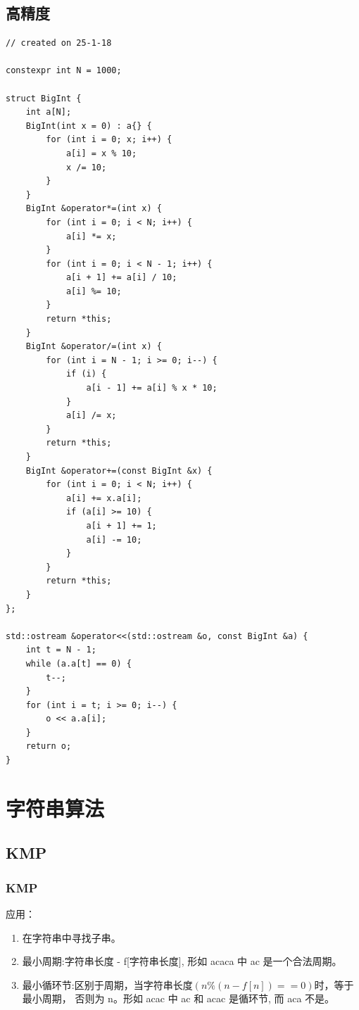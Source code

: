 \documentclass[a4paper,12pt]{article}
\begin{document}
\subsection{高精度}
\begin{lstlisting}
// created on 25-1-18

constexpr int N = 1000;

struct BigInt {
    int a[N];
    BigInt(int x = 0) : a{} {
        for (int i = 0; x; i++) {
            a[i] = x % 10;
            x /= 10;
        }
    }
    BigInt &operator*=(int x) {
        for (int i = 0; i < N; i++) {
            a[i] *= x;
        }
        for (int i = 0; i < N - 1; i++) {
            a[i + 1] += a[i] / 10;
            a[i] %= 10;
        }
        return *this;
    }
    BigInt &operator/=(int x) {
        for (int i = N - 1; i >= 0; i--) {
            if (i) {
                a[i - 1] += a[i] % x * 10;
            }
            a[i] /= x;
        }
        return *this;
    }
    BigInt &operator+=(const BigInt &x) {
        for (int i = 0; i < N; i++) {
            a[i] += x.a[i];
            if (a[i] >= 10) {
                a[i + 1] += 1;
                a[i] -= 10;
            }
        }
        return *this;
    }
};

std::ostream &operator<<(std::ostream &o, const BigInt &a) {
    int t = N - 1;
    while (a.a[t] == 0) {
        t--;
    }
    for (int i = t; i >= 0; i--) {
        o << a.a[i];
    }
    return o;
}
\end{lstlisting}
\newpage

\section{字符串算法}
\subsection{KMP}

\subsubsection{KMP}

\noindent 应用：
\begin{enumerate}
\item 在字符串中寻找子串。
\item 最小周期:字符串长度 - f[字符串长度], 
形如 acaca 中 ac 是一个合法周期。
\item 最小循环节:区别于周期，当字符串长度$(n\%(n-f[n])==0)$时，等于最小周期，
否则为 n。形如 acac 中 ac 和 acac 是循环节, 而 aca 不是。
\end{enumerate}
\end{document}
